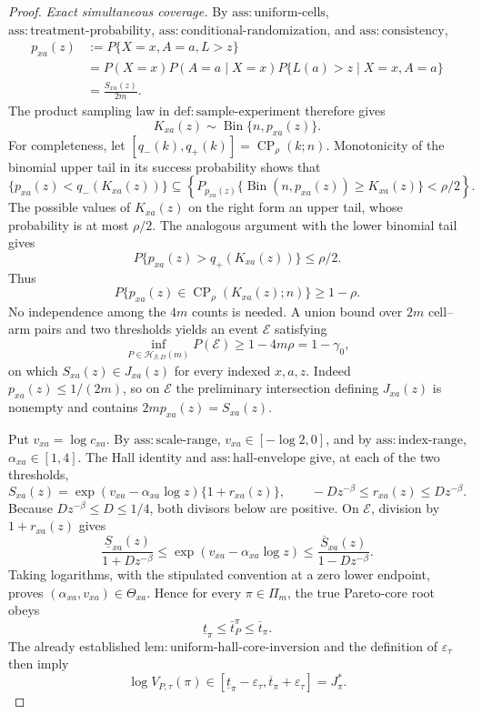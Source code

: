 \documentclass{article}
\begin{document}
\begin{proof}
\emph{Exact simultaneous coverage.}  By \(\mathrm{ass{:}uniform\text{-}cells}\), \(\mathrm{ass{:}treatment\text{-}probability}\), \(\mathrm{ass{:}conditional\text{-}randomization}\), and \(\mathrm{ass{:}consistency}\),
\[
 \begin{aligned}
 p_{xa}(z)
 &:=P\{X=x,A=a,L>z\}\\
 &=P(X=x)P(A=a\mid X=x)
   P\{L(a)>z\mid X=x,A=a\}\\
 &=\frac{S_{xa}(z)}{2m}.
 \end{aligned}
\]
The product sampling law in \(\mathrm{def{:}sample\text{-}experiment}\) therefore gives
\[
 K_{xa}(z)\sim\operatorname{Bin}\{n,p_{xa}(z)\}.
\]
For completeness, let \([q_-(k),q_+(k)]=\operatorname{CP}_{\rho}(k;n)\).  Monotonicity of the binomial upper tail in its success probability shows that
\[
 \{p_{xa}(z)<q_-(K_{xa}(z))\}
 \subseteq
 \left\{P_{p_{xa}(z)}\{\operatorname{Bin}(n,p_{xa}(z))\geq K_{xa}(z)\}<\rho/2\right\}.
\]
The possible values of \(K_{xa}(z)\) on the right form an upper tail, whose probability is at most \(\rho/2\).  The analogous argument with the lower binomial tail gives
\[
 P\{p_{xa}(z)>q_+(K_{xa}(z))\}\leq\rho/2.
\]
Thus
\[
 P\{p_{xa}(z)\in\operatorname{CP}_{\rho}(K_{xa}(z);n)\}\geq1-\rho.
\]
No independence among the \(4m\) counts is needed.  A union bound over \(2m\) cell--arm pairs and two thresholds yields an event \(\mathcal E\) satisfying
\[
 \inf_{P\in\mathcal H_{\beta,D}(m)}P(\mathcal E)
 \geq 1-4m\rho=1-\gamma _0,
\]
on which \(S_{xa}(z)\in J_{xa}(z)\) for every indexed \(x,a,z\).  Indeed \(p_{xa}(z)\leq1/(2m)\), so on \(\mathcal E\) the preliminary intersection defining \(J_{xa}(z)\) is nonempty and contains \(2mp_{xa}(z)=S_{xa}(z)\).

Put \(v_{xa}=\log c_{xa}\).  By \(\mathrm{ass{:}scale\text{-}range}\), \(v_{xa}\in[-\log2,0]\), and by \(\mathrm{ass{:}index\text{-}range}\), \(\alpha_{xa}\in[1,4]\).  The Hall identity and \(\mathrm{ass{:}hall\text{-}envelope}\) give, at each of the two thresholds,
\[
 S_{xa}(z)=\exp(v_{xa}-\alpha_{xa}\log z)\{1+r_{xa}(z)\},
 \qquad -Dz^{-\beta}\leq r_{xa}(z)\leq Dz^{-\beta}.
\]
Because \(Dz^{-\beta}\leq D\leq1/4\), both divisors below are positive.  On \(\mathcal E\), division by \(1+r_{xa}(z)\) gives
\[
 \frac{\underline S_{xa}(z)}{1+Dz^{-\beta}}
 \leq \exp(v_{xa}-\alpha_{xa}\log z)
 \leq \frac{\overline S_{xa}(z)}{1-Dz^{-\beta}}.
\]
Taking logarithms, with the stipulated convention at a zero lower endpoint, proves \((\alpha_{xa},v_{xa})\in\Theta_{xa}\).  Hence for every \(\pi\in\Pi_m\), the true Pareto-core root obeys
\[
 \underline t_\pi\leq\bar t_P^\pi\leq\overline t_\pi.
\]
The already established \(\mathrm{lem{:}uniform\text{-}hall\text{-}core\text{-}inversion}\) and the definition of \(\varepsilon_\tau\) then imply
\[
 \log V_{P,\tau}(\pi)
 \in[\underline t_\pi-\varepsilon_\tau,
      \overline t_\pi+\varepsilon_\tau]
 =J^*_{\pi}.
\]


\end{proof}
\end{document}
